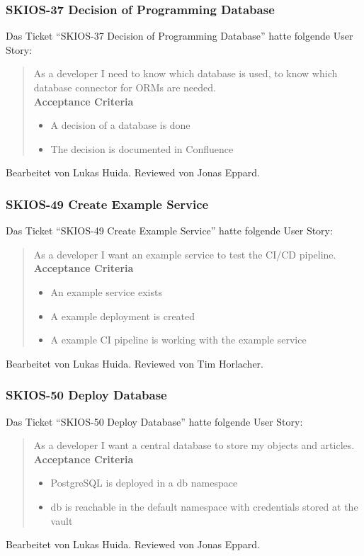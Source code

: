 \subsubsection{SKIOS-37 Decision of Programming Database}
Das Ticket \enquote{SKIOS-37 Decision of Programming Database} hatte folgende User Story:
\begin{quotation}
    As a developer I need to know which database is used, to know which database connector for ORMs are needed. \\
    \textbf{Acceptance Criteria}
    \begin{itemize}
        \item A decision of a database is done
        \item The decision is documented in Confluence
    \end{itemize}
\end{quotation}
Bearbeitet von Lukas Huida.
Reviewed von Jonas Eppard.

\subsubsection{SKIOS-49 Create Example Service}
Das Ticket \enquote{SKIOS-49 Create Example Service} hatte folgende User Story:
\begin{quotation}
    As a developer I want an example service to test the CI/CD pipeline. \\
    \textbf{Acceptance Criteria}
    \begin{itemize}
        \item An example service exists
        \item A example deployment is created
        \item A example CI pipeline is working with the example service
    \end{itemize}
\end{quotation}
Bearbeitet von Lukas Huida.
Reviewed von Tim Horlacher.

\subsubsection{SKIOS-50 Deploy Database}
Das Ticket \enquote{SKIOS-50 Deploy Database} hatte folgende User Story:
\begin{quotation}
    As a developer I want a central database to store my objects and articles. \\
    \textbf{Acceptance Criteria}
    \begin{itemize}
        \item PostgreSQL is deployed in a db namespace
        \item db is reachable in the default namespace with credentials stored at the vault
    \end{itemize}
\end{quotation}
Bearbeitet von Lukas Huida.
Reviewed von Jonas Eppard.

